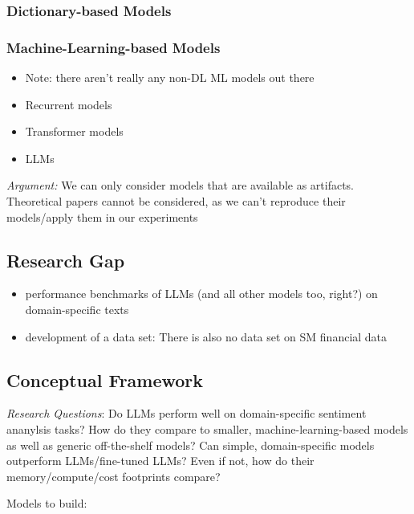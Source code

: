 \subsubsection{Dictionary-based Models}


\subsubsection{Machine-Learning-based Models}
\begin{itemize}[noitemsep]
	\item Note: there aren't really any non-DL ML models out there
	\item Recurrent models
	\item Transformer models
	\item LLMs
\end{itemize}


\emph{Argument:} We can only consider models that are available as artifacts. Theoretical papers cannot be considered, as we can't reproduce their models/apply them in our experiments










\subsection{Research Gap}
\begin{itemize}[noitemsep]
	\item performance benchmarks of LLMs (and all other models too, right?) on domain-specific texts
	\item development of a data set: There is also no data set on SM financial data 	
\end{itemize}







\subsection{Conceptual Framework}



\emph{Research Questions}: Do LLMs perform well on domain-specific sentiment ananylsis tasks? How do they compare to smaller, machine-learning-based models as well as generic off-the-shelf models? Can simple, domain-specific models outperform LLMs/fine-tuned LLMs? Even if not, how do their memory/compute/cost footprints compare? 

Models to build:










